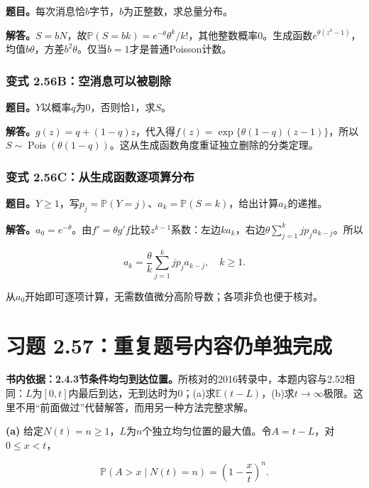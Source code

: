 \documentclass[12pt,a4paper,UTF8,fontset=fandol]{ctexart}
\begin{document}
\textbf{题目。}每次消息恰\(b\)字节，\(b\)为正整数，求总量分布。

\textbf{解答。}\(S=bN\)，故\(\mathbb P(S=bk)=e^{-\theta}\theta^k/k!\)，其他整数概率0。生成函数\(e^{\theta(z^b-1)}\)，均值\(b\theta\)，方差\(b^2\theta\)。仅当\(b=1\)才是普通Poisson计数。

\subsubsection{变式
2.56B：空消息可以被剔除}\label{ux53d8ux5f0f-2.56bux7a7aux6d88ux606fux53efux4ee5ux88abux5254ux9664}

\textbf{题目。}\(Y\)以概率\(q\)为0，否则恰1，求\(S\)。

\textbf{解答。}\(g(z)=q+(1-q)z\)，代入得\(f(z)=\exp\{\theta(1-q)(z-1)\}\)，所以\(S\sim\operatorname{Pois}(\theta(1-q))\)。这从生成函数角度重证独立删除的分类定理。

\subsubsection{变式
2.56C：从生成函数逐项算分布}\label{ux53d8ux5f0f-2.56cux4eceux751fux6210ux51fdux6570ux9010ux9879ux7b97ux5206ux5e03}

\textbf{题目。}\(Y\ge1\)，写\(p_j=\mathbb P(Y=j)\)、\(a_k=\mathbb P(S=k)\)，给出计算\(a_k\)的递推。

\textbf{解答。}\(a_0=e^{-\theta}\)。由\(f'=\theta g'f\)比较\(z^{k-1}\)系数：左边\(ka_k\)，右边\(\theta\sum_{j=1}^k jp_j a_{k-j}\)。所以

\[a_k=\frac\theta k\sum_{j=1}^k jp_j a_{k-j},\quad k\ge1.\]

从\(a_0\)开始即可逐项计算，无需数值微分高阶导数；各项非负也便于核对。

\section{习题
2.57：重复题号内容仍单独完成}\label{ux4e60ux9898-2.57ux91cdux590dux9898ux53f7ux5185ux5bb9ux4ecdux5355ux72ecux5b8cux6210}

\textbf{书内依据：2.4.3节条件均匀到达位置。}所核对的2016转录中，本题内容与2.52相同：\(L\)为\([0,t]\)内最后到达，无到达时为0；(a)求\(\mathbb E(t-L)\)，(b)求\(t\to\infty\)极限。这里不用``前面做过''代替解答，而用另一种方法完整求解。

\textbf{(a)}
给定\(N(t)=n\ge1\)，\(L\)为\(n\)个独立均匀位置的最大值。令\(A=t-L\)，对\(0\le x<t\)，

\[\mathbb P(A>x\mid N(t)=n)=\left(1-\frac xt\right)^n.\]
\end{document}
